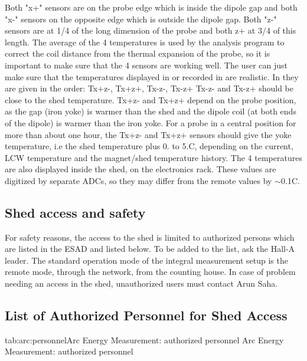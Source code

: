 {Both "x+" sensors are on the probe edge which is inside the
dipole gap and both "x-" sensors on the opposite edge which
is outside the dipole gap. Both "z-" sensors are at 1/4 of
the long dimension of the probe and both z+ at 3/4 of this length. The average
of the 4 temperatures is used by the analysis program to correct the coil distance
from the thermal expansion of the probe, so it is important to make sure that
the 4 sensors are working well. The user can just make sure that the temperatures
displayed in  or recorded in 
are realistic. In  they are given in the
order: Tx+z-, Tx+z+, Tx-z-, Tx-z+ Tx-z- and Tx-z+ should be close to the shed
temperature. Tx+z- and Tx+z+ depend on the probe position, as the gap (iron
yoke) is warmer than the shed and the dipole coil (at both ends of the dipole)
is warmer than the iron yoke. For a probe in a central position for more than
about one hour, the Tx+z- and Tx+z+ sensors should give the yoke temperature,
i.e the shed temperature plus 0. to 5.C, depending on the current, LCW temperature
and the magnet/shed temperature history. The 4 temperatures are also displayed
inside the shed, on the electronics rack. These values are digitized by separate
ADCs, so they may differ from the remote values by \( \sim  \)0.1C. 

}

\begin{safetyen}{10}{10}
\section{Shed access and safety }

For safety reasons, the access to the shed is limited to authorized
persons which are listed in the ESAD and listed below. To be added to the list, 
ask the 
Hall-A leader. 
The standard
operation mode of the integral measurement setup is the remote mode, through
the network, from the counting house. In case of problem needing an access in
the shed, unauthorized users must contact Arun Saha.
\end{safetyen}

\begin{safetyen}{10}{10}
\section{List of Authorized Personnel for Shed Access}
\end{safetyen}

\begin{namestab}{tab:arc:personnel}{Arc Energy Measurement: authorized personnel}{%
                 Arc Energy Measurement: authorized personnel}
  \MichaelTiefenback{}
  \YvesRoblin{}
  \RickGonzales{}
  \BillMerz{}
  \MarkAugustine{}
  \HariAreti{}
  \PeteFrancis{}
  \ScottHiggins{}
  \DavidSeidman{}
  \RonLauze{}
  \TonyDay{}
  \PascalVernin{}
  \ChristianVeyssiere{}
  \FrancoisGougnaud{}
  \JacquesMarroncle{}
\end{namestab}


